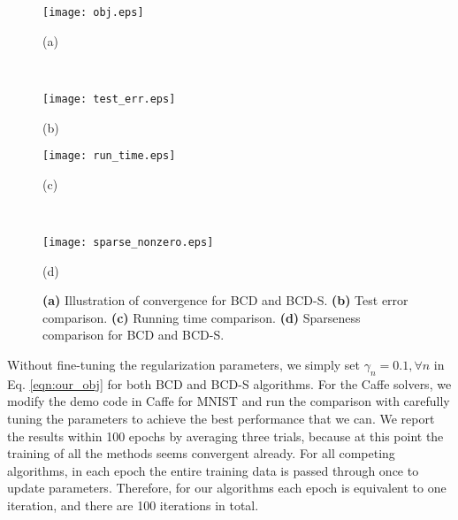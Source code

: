 \documentclass{article}
\begin{document}
\begin{figure}
\centering
    \begin{minipage}[b]{0.49\linewidth}
    \centering
        \texttt{[image: obj.eps]}
        \centerline{\footnotesize (a)}
    \end{minipage}
    ~ %
    \begin{minipage}[b]{0.49\linewidth}
    \centering
        \texttt{[image: test\_err.eps]}
        \centerline{\footnotesize (b)}
    \end{minipage}  
    \begin{minipage}[b]{0.49\linewidth}
    \centering
        \texttt{[image: run\_time.eps]}
        \centerline{\footnotesize (c)}
    \end{minipage}
    ~ %
    \begin{minipage}[b]{0.49\linewidth}
    \centering
        \texttt{[image: sparse\_nonzero.eps]}
        \centerline{\footnotesize (d)}
    \end{minipage}  
    \vspace{-5mm}
    \caption{\footnotesize {\bf (a)} Illustration of convergence for BCD and BCD-S. {\bf (b)} Test error comparison. {\bf (c)} Running time comparison. {\bf (d)} Sparseness comparison for BCD and BCD-S.}\label{fig:error}
    \vspace{-4mm}
\end{figure} 

Without fine-tuning the regularization parameters, we simply set $\gamma_n=0.1, \forall n$ in Eq. \ref{eqn:our_obj} for both BCD and BCD-S algorithms. For the Caffe solvers, we modify the demo code in Caffe for MNIST and run the comparison with carefully tuning the parameters %
to achieve the best performance that we can. We report the results within 100 epochs by averaging three trials, because at this point the training of all the methods seems convergent already. For all competing algorithms, in each epoch the entire training data is passed through once to update parameters. Therefore, for our algorithms each epoch is equivalent to one iteration, and there are 100 iterations in total.
\end{document}
